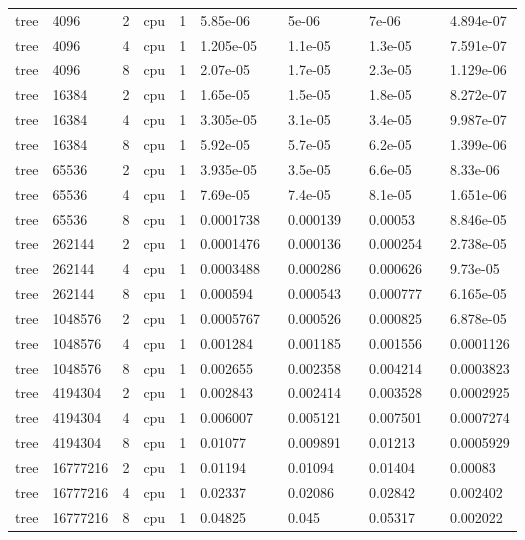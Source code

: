 \begin{tabular}{llllllllllll}
tree & 4096 & 2 & cpu & 1 & 5.85e-06 &  & 5e-06 &  & 7e-06 &  & 4.894e-07 \\
tree & 4096 & 4 & cpu & 1 & 1.205e-05 &  & 1.1e-05 &  & 1.3e-05 &  & 7.591e-07 \\
tree & 4096 & 8 & cpu & 1 & 2.07e-05 &  & 1.7e-05 &  & 2.3e-05 &  & 1.129e-06 \\
tree & 16384 & 2 & cpu & 1 & 1.65e-05 &  & 1.5e-05 &  & 1.8e-05 &  & 8.272e-07 \\
tree & 16384 & 4 & cpu & 1 & 3.305e-05 &  & 3.1e-05 &  & 3.4e-05 &  & 9.987e-07 \\
tree & 16384 & 8 & cpu & 1 & 5.92e-05 &  & 5.7e-05 &  & 6.2e-05 &  & 1.399e-06 \\
tree & 65536 & 2 & cpu & 1 & 3.935e-05 &  & 3.5e-05 &  & 6.6e-05 &  & 8.33e-06 \\
tree & 65536 & 4 & cpu & 1 & 7.69e-05 &  & 7.4e-05 &  & 8.1e-05 &  & 1.651e-06 \\
tree & 65536 & 8 & cpu & 1 & 0.0001738 &  & 0.000139 &  & 0.00053 &  & 8.846e-05 \\
tree & 262144 & 2 & cpu & 1 & 0.0001476 &  & 0.000136 &  & 0.000254 &  & 2.738e-05 \\
tree & 262144 & 4 & cpu & 1 & 0.0003488 &  & 0.000286 &  & 0.000626 &  & 9.73e-05 \\
tree & 262144 & 8 & cpu & 1 & 0.000594 &  & 0.000543 &  & 0.000777 &  & 6.165e-05 \\
tree & 1048576 & 2 & cpu & 1 & 0.0005767 &  & 0.000526 &  & 0.000825 &  & 6.878e-05 \\
tree & 1048576 & 4 & cpu & 1 & 0.001284 &  & 0.001185 &  & 0.001556 &  & 0.0001126 \\
tree & 1048576 & 8 & cpu & 1 & 0.002655 &  & 0.002358 &  & 0.004214 &  & 0.0003823 \\
tree & 4194304 & 2 & cpu & 1 & 0.002843 &  & 0.002414 &  & 0.003528 &  & 0.0002925 \\
tree & 4194304 & 4 & cpu & 1 & 0.006007 &  & 0.005121 &  & 0.007501 &  & 0.0007274 \\
tree & 4194304 & 8 & cpu & 1 & 0.01077 &  & 0.009891 &  & 0.01213 &  & 0.0005929 \\
tree & 16777216 & 2 & cpu & 1 & 0.01194 &  & 0.01094 &  & 0.01404 &  & 0.00083 \\
tree & 16777216 & 4 & cpu & 1 & 0.02337 &  & 0.02086 &  & 0.02842 &  & 0.002402 \\
tree & 16777216 & 8 & cpu & 1 & 0.04825 &  & 0.045 &  & 0.05317 &  & 0.002022 \\
\hline
\end{tabular}
